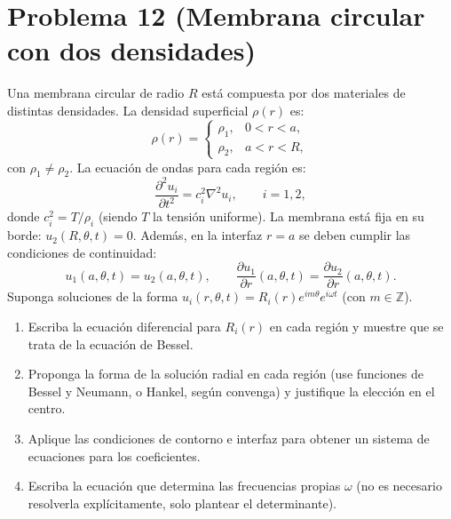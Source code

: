 \documentclass[12pt]{article}
\begin{document}
\section*{Problema 12 (Membrana circular con dos densidades)}
Una membrana circular de radio \(R\) está compuesta por dos materiales de distintas densidades. La densidad superficial \(\rho(r)\) es:
\[
\rho(r) = 
\begin{cases}
\rho_1, & 0 < r < a, \\
\rho_2, & a < r < R,
\end{cases}
\]
con \(\rho_1 \neq \rho_2\). La ecuación de ondas para cada región es:
\[
\frac{\partial^2 u_i}{\partial t^2} = c_i^2 \nabla^2 u_i, \qquad i = 1, 2,
\]
donde \(c_i^2 = T/\rho_i\) (siendo \(T\) la tensión uniforme). La membrana está fija en su borde: \(u_2(R, \theta, t) = 0\). Además, en la interfaz \(r = a\) se deben cumplir las condiciones de continuidad:
\[
u_1(a, \theta, t) = u_2(a, \theta, t), \qquad \frac{\partial u_1}{\partial r}(a, \theta, t) = \frac{\partial u_2}{\partial r}(a, \theta, t).
\]
Suponga soluciones de la forma \(u_i(r, \theta, t) = R_i(r) e^{i m \theta} e^{i \omega t}\) (con \(m \in \mathbb{Z}\)).
\begin{enumerate}
    \item[(a)] Escriba la ecuación diferencial para \(R_i(r)\) en cada región y muestre que se trata de la ecuación de Bessel.
    \item[(b)] Proponga la forma de la solución radial en cada región (use funciones de Bessel y Neumann, o Hankel, según convenga) y justifique la elección en el centro.
    \item[(c)] Aplique las condiciones de contorno e interfaz para obtener un sistema de ecuaciones para los coeficientes.
    \item[(d)] Escriba la ecuación que determina las frecuencias propias \(\omega\) (no es necesario resolverla explícitamente, solo plantear el determinante).
\end{enumerate}
\end{document}

